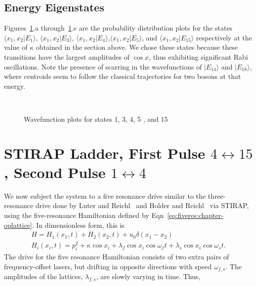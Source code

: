 \subsection{Energy Eigenstates}
Figures~\ref{fig:wavefunctions:chapter-oplattice}.a through~\ref{fig:wavefunctions:chapter-oplattice}.e are the probability distribution plots for the states $\langle x_1, x_2 | E_1 \rangle$, $\langle x_1, x_2 | E_3 \rangle$, $\langle x_1, x_2 | E_4 \rangle$,$\langle x_1, x_2 | E_5 \rangle$, and $\langle x_1, x_2 | E_{15} \rangle$ respectively at the value of $\kappa$ obtained in the section above. We chose these states because these transitions have the largest  amplitudes of $\cos{x}$, thus exhibiting significant Rabi oscillations. Note the presence of scarring in the wavefunctions of $|E_{14}\rangle$  and $|E_{18}\rangle$, where centroids seem to follow the classical trajectories for two bosons at that energy.

\begin{figure} 
\ 
\caption{Wavefunction plots for states 1, 3, 4, 5 , and 15}
\label{fig:wavefunctions:chapter-oplattice}
\end{figure}

\section{\label{sec:4} STIRAP Ladder, First Pulse $4 \leftrightarrow 15$, Second Pulse $1 \leftrightarrow 4$}
We now subject the system to a five resonance drive similar to the three-resonance drive done by Luter and Reichl~\cite{luter:reichl:3res} and Holder and Reichl~\cite{holder-reichl:avoidedcross} via STIRAP, using the five-resonance Hamiltonian defined by Eqn~\ref{eq:fiveres:chapter-oplattice}. In dimensionless form, this is 
\begin{eqnarray}
H=H_1(x_1,t)+H_2(x_2,t)+u_0 \delta(x_1-x_2) \\
H_i(x_i,t)=p_i^2 +\kappa \cos{x_i}+ \lambda_f \cos{x_i } \cos{ \omega_f t}+\lambda_s \cos{x_i} \cos{ \omega_s t}.
\end{eqnarray}
The drive for the five resonance Hamiltonian consists of two extra pairs of frequency-offset lasers, but drifting in opposite directions with speed $\omega_{f,s}$. The amplitudes of the lattices, $\lambda_{f,s}$, are slowly varying in time. Thus, 

